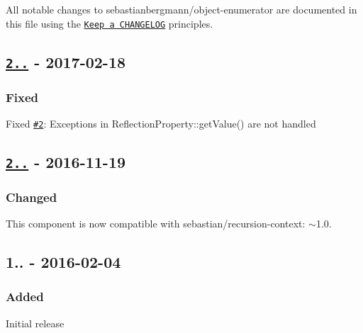All notable changes to {\ttfamily sebastianbergmann/object-\/enumerator} are documented in this file using the \href{http://keepachangelog.com/}{\tt Keep a C\+H\+A\+N\+G\+E\+L\+OG} principles.

\subsection*{\href{https://github.com/sebastianbergmann/object-enumerator/compare/2.0.0...2.0.1}{\tt 2..} -\/ 2017-\/02-\/18}

\subsubsection*{Fixed}


\begin{DoxyItemize}
\item Fixed \href{https://github.com/sebastianbergmann/phpunit/pull/2}{\tt \#2}\+: Exceptions in {\ttfamily Reflection\+Property\+::get\+Value()} are not handled
\end{DoxyItemize}

\subsection*{\href{https://github.com/sebastianbergmann/object-enumerator/compare/1.0...2.0.0}{\tt 2..} -\/ 2016-\/11-\/19}

\subsubsection*{Changed}


\begin{DoxyItemize}
\item This component is now compatible with {\ttfamily sebastian/recursion-\/context\+: $\sim$1.0.}
\end{DoxyItemize}

\subsection*{1.. -\/ 2016-\/02-\/04}

\subsubsection*{Added}


\begin{DoxyItemize}
\item Initial release 
\end{DoxyItemize}